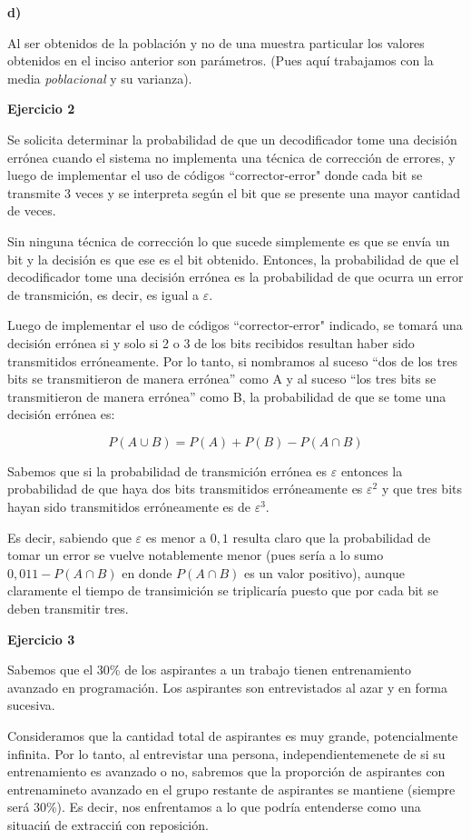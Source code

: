 \documentclass[11pt]{article}
\begin{document}
\textbf{d)} \par

Al ser obtenidos de la poblaci\'on y no de una muestra particular los valores obtenidos en el inciso anterior son par\'ametros. (Pues aqu\'i trabajamos con la media \emph{poblacional} y su varianza).




\textbf{Ejercicio 2}

Se solicita determinar la probabilidad de que un decodificador tome una decisi\'on err\'onea cuando el sistema no implementa una t\'ecnica de correcci\'on de errores, y luego de implementar el uso de c\'odigos ``corrector-error" donde cada bit se transmite 3 veces y se interpreta seg\'un el bit que se presente una mayor cantidad de veces. 

Sin ninguna t\'ecnica de correcci\'on lo que sucede simplemente es que se env\'ia un bit y la decisi\'on es que ese es el bit obtenido. Entonces, la probabilidad de que el decodificador tome una decisi\'on err\'onea es la probabilidad de que ocurra un error de transmici\'on, es decir, es igual a $\varepsilon$. 

Luego de implementar el uso de códigos ``corrector-error" indicado, se tomar\'a una decisi\'on err\'onea si y solo si 2 o 3 de los bits recibidos resultan haber sido transmitidos err\'oneamente. Por lo tanto, si nombramos al suceso ``dos de los tres bits se transmitieron de manera err\'onea'' como A y al suceso ``los tres bits se transmitieron de manera err\'onea'' como B, la probabilidad de que se tome una decisi\'on err\'onea es:

\[P(A\cup B) = P(A)+P(B)-P(A\cap B)\]

Sabemos que si la probabilidad de transmici\'on err\'onea es $\varepsilon$ entonces la probabilidad de que haya dos bits transmitidos err\'oneamente es $\varepsilon^{2}$ y que tres bits hayan sido transmitidos err\'oneamente es de $\varepsilon^3$. 

Es decir, sabiendo que $\varepsilon$ es menor a $0,1$ resulta claro que la probabilidad de tomar un error se vuelve notablemente menor (pues ser\'ia a lo sumo $0,011-P(A\cap B)$ en donde $P(A\cap B)$ es un valor positivo), aunque claramente el tiempo de transimici\'on se triplicar\'ia puesto que por cada bit se deben transmitir tres.

\textbf{Ejercicio 3}

Sabemos que el 30\% de los aspirantes a un trabajo tienen entrenamiento avanzado en programaci\'on. Los aspirantes son entrevistados al azar y en forma sucesiva. \par
Consideramos que la cantidad total de aspirantes es muy grande, potencialmente infinita. Por lo tanto, al entrevistar una persona, independientemenete de si su entrenamiento es avanzado o no, sabremos que la proporci\'on de aspirantes con entrenamineto avanzado en el grupo restante de aspirantes se mantiene (siempre ser\'a 30\%). Es decir, nos enfrentamos a lo que podr\'ia entenderse como una situaci\'n de extracci\'n con reposici\'on. \par
\end{document}
